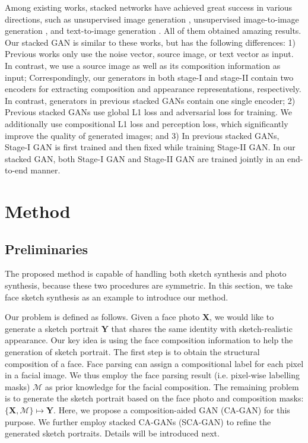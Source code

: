 \documentclass[journal]{IEEEtran}
\begin{document}
Among existing works, stacked networks have achieved great success in various directions, such as unsupervised image generation \cite{Huang2016Stacked}, unsupervised image-to-image generation \cite{Li2018Unsupervised}, and text-to-image generation \cite{Zhang2017StackGAN}. All of them obtained amazing results. Our stacked GAN is similar to these works, but has the following differences:
1) Previous works only use the noise vector, source image, or text vector as input. In contrast, we use a source image as well as its composition information as input;
Correspondingly, our generators in both stage-I and stage-II contain two encoders for extracting composition and appearance representations, respectively. In contrast, generators in previous stacked GANs contain one single encoder;
2) Previous stacked GANs use global L1 loss and adversarial loss for training. We additionally use compositional L1 loss and perception loss, which significantly improve the quality of generated images; and 
3) In previous stacked GANs, Stage-I GAN is first trained and then fixed while training Stage-II GAN. In our stacked GAN, both Stage-I GAN and Stage-II GAN are trained jointly in an end-to-end manner. 






\section{Method}
\label{sec:method}

\subsection{Preliminaries}
\label{sec:preliminary}

The proposed method is capable of handling both sketch synthesis and photo synthesis, because these two procedures are symmetric. In this section, we take face sketch synthesis as an example to introduce our method. 

Our problem is defined as follows. Given a face photo $\mathbf{X}$, we would like to generate a sketch portrait $\mathbf{Y}$ that shares the same identity with sketch-realistic appearance. Our key idea is using the face composition information to help the generation of sketch portrait.
The first step is to obtain the structural composition of a face. Face parsing can assign a compositional label for each pixel in a facial image. We thus employ the face parsing result (i.e. pixel-wise labelling masks) $\mathcal{M}$ as prior knowledge for the facial composition.
The remaining problem is to generate the sketch portrait based on the face photo and composition masks: $\{\mathbf{X}, \mathcal{M}\} \mapsto \mathbf{Y}$. Here, we propose a composition-aided GAN (CA-GAN) for this purpose.
We further employ stacked CA-GANs (SCA-GAN) to refine the generated sketch portraits.
Details will be introduced next.
\end{document}
